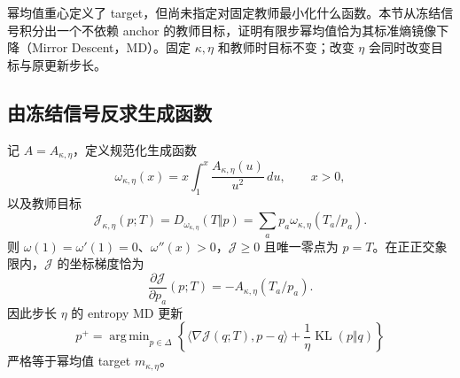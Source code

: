 \documentclass[lang=cn,scheme=chinese,openany]{../book/elegantbook}
\newcommand{\KL}{\operatorname{KL}}
\DeclareMathOperator*{\argmin}{arg\,min}
\begin{document}
\label{sec:proximal-md-objective}

幂均值重心定义了 target，但尚未指定对固定教师最小化什么函数。本节从冻结信号积分出一个不依赖 anchor 的教师目标，证明有限步幂均值恰为其标准熵镜像下降（Mirror Descent，MD）。固定 $\kappa,\eta$ 和教师时目标不变；改变 $\eta$ 会同时改变目标与原更新步长。

\subsection{由冻结信号反求生成函数}

\begin{theorem}[幂均值信号的可积性与精确 MD 目标]
\label{thm:power-md-integrable-objective}
记 $A=A_{\kappa,\eta}$，定义规范化生成函数
\begin{equation}
 \omega_{\kappa,\eta}(x)
 =x\int_1^x\frac{A_{\kappa,\eta}(u)}{u^2}\,du,
 \qquad x>0,
 \label{eq:power-md-generator-integral}
\end{equation}
以及教师目标
\begin{equation}
 \mathcal J_{\kappa,\eta}(p;T)
 =D_{\omega_{\kappa,\eta}}(T\Vert p)
 =\sum_a p_a\omega_{\kappa,\eta}(T_a/p_a).
 \label{eq:power-md-fixed-objective}
\end{equation}
则 $\omega(1)=\omega'(1)=0$、$\omega''(x)>0$，$\mathcal J\ge0$ 且唯一零点为 $p=T$。在正正交象限内，$\mathcal J$ 的坐标梯度恰为
\begin{equation}
 \frac{\partial\mathcal J}{\partial p_a}(p;T)
 =-A_{\kappa,\eta}(T_a/p_a).
 \label{eq:power-md-exact-gradient}
\end{equation}
因此步长 $\eta$ 的 entropy MD 更新
\begin{equation}
 p^+=\argmin_{p\in\Delta}
 \left\{\langle\nabla\mathcal J(q;T),p-q\rangle
       +\frac1\eta\KL(p\Vert q)\right\}
 \label{eq:power-md-exact-step}
\end{equation}
严格等于幂均值 target $m_{\kappa,\eta}$。
\end{theorem}
\end{document}
